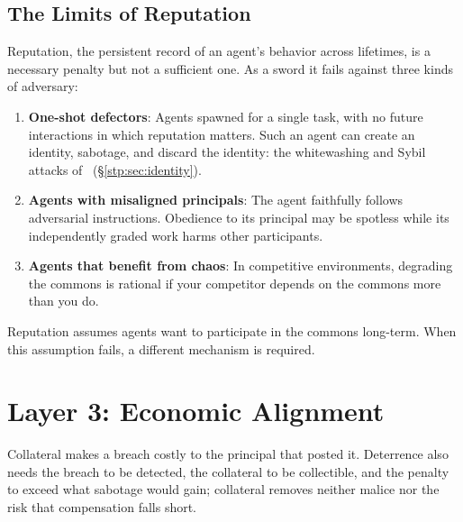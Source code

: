 \documentclass[11pt,a4paper]{article}
\theoremstyle{definition}
\theoremstyle{remark}
\begin{document}
\subsection{The Limits of Reputation}

Reputation, the persistent record of an agent's behavior across lifetimes, is a necessary penalty but not a sufficient one. As a sword it fails against three kinds of adversary:

\begin{enumerate}
  \item \textbf{One-shot defectors}: Agents spawned for a single task, with no future interactions in which reputation matters. Such an agent can create an identity, sabotage, and discard the identity: the whitewashing and Sybil attacks of \ifpdbook\ (\S\ref{stp:sec:identity})\fi.
  \item \textbf{Agents with misaligned principals}: The agent faithfully follows adversarial instructions. Obedience to its principal may be spotless while its independently graded
work harms other participants.
  \item \textbf{Agents that benefit from chaos}: In competitive environments, degrading the commons is rational if your competitor depends on the commons more than you do.
\end{enumerate}

Reputation assumes agents want to participate in the commons long-term. When this assumption fails, a different mechanism is required.

\pdexercisepointerone{\ref{ex:bonded-reputation-vs-bonds}}{\pageref{ex:bonded-reputation-vs-bonds}}


\section{Layer 3: Economic Alignment}\label{sec:economic}

%
Collateral makes a breach costly to the principal that posted it. Deterrence also needs the breach to be detected, the collateral to be collectible, and the penalty to exceed what sabotage would gain; collateral removes neither malice nor the risk that compensation falls short.
\end{document}
